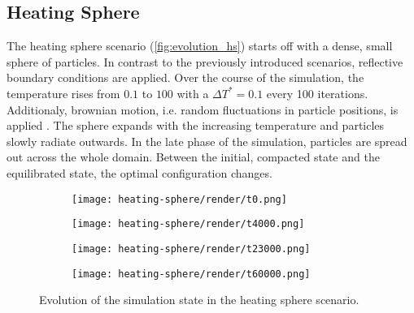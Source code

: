\subsection{Heating Sphere}
\label{subsec:hs}
The heating sphere scenario (\autoref{fig:evolution_hs}) starts off with a dense, small sphere of particles. In contrast to the previously introduced scenarios, reflective boundary conditions are applied. Over the course of the simulation, the temperature rises from $0.1$ to $100$ with a $\Delta \si{T^{*}}=0.1$ every 100 iterations. Additionaly, brownian motion, i.e. random fluctuations in particle positions, is applied \cite{Moerters2010}. The sphere expands with the increasing temperature and particles slowly radiate outwards. In the late phase of the simulation, particles are spread out across the whole domain.
Between the initial, compacted state and the equilibrated state, the optimal configuration changes.

\begin{figure}[htpb]
	\centering
	\fastcolorbarhor

	\begin{subfigure}[c]{.25\textwidth}
		\texttt{[image: heating-sphere/render/t0.png]}
	\end{subfigure}%
	\begin{subfigure}[c]{.25\textwidth}
		\texttt{[image: heating-sphere/render/t4000.png]}
	\end{subfigure}%
	\begin{subfigure}[c]{.25\textwidth}
		\texttt{[image: heating-sphere/render/t23000.png]}
	\end{subfigure}%
	\begin{subfigure}[c]{.25\textwidth}
		\vspace*{0.1\textwidth}
		\centering
		\texttt{[image: heating-sphere/render/t60000.png]}
		\vspace*{0.1\textwidth}
	\end{subfigure}%
	\caption{Evolution of the simulation state in the heating sphere scenario.}
	\label{fig:evolution_hs}
\end{figure}

